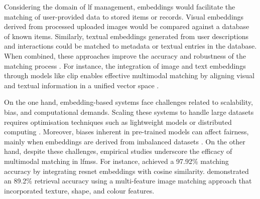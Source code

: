 Considering the domain of \ac{lf} management, embeddings would facilitate the matching of user-provided data to stored items or records. Visual embeddings derived from processed uploaded images would be compared against a database of known items. Similarly, textual embeddings generated from user descriptions and interactions could be matched to metadata or textual entries in the database. When combined, these approaches improve the accuracy and robustness of the matching process \cite{Prawira2024, Radford2021}. For instance, the integration of image and text embeddings through models like \ac{clip} enables effective multimodal matching by aligning visual and textual information in a unified vector space \cite{Radford2021}.

On the one hand, embedding-based systems face challenges related to scalability, bias, and computational demands. Scaling these systems to handle large datasets requires optimisation techniques such as lightweight models or distributed computing \cite{Lubna2021}. Moreover, biases inherent in pre-trained models can affect fairness, mainly when embeddings are derived from imbalanced datasets \cite{Prawira2024}. On the other hand, despite these challenges, empirical studies underscore the efficacy of multimodal matching in \acp{lfms}. For instance,  achieved a 97.92\% matching accuracy by integrating \ac{resnet} embeddings with cosine similarity.  demonstrated an 89.2\% retrieval accuracy using a multi-feature image matching approach that incorporated texture, shape, and colour features.









